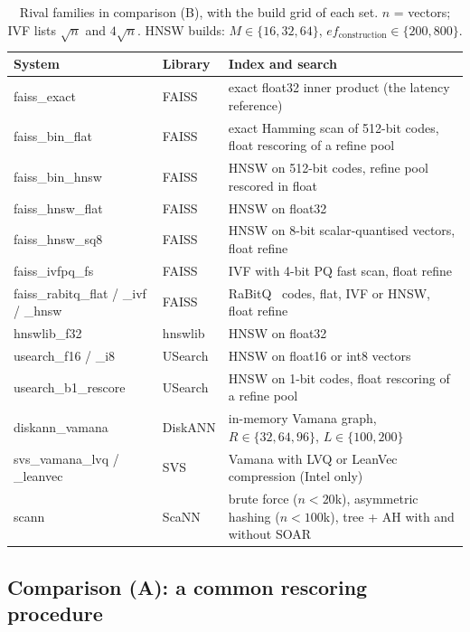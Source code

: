 \begin{table}[t]\centering\small
\caption{Rival families in comparison (B), with the build grid of each set. $n$ = vectors; IVF lists
$\sqrt n$ and $4\sqrt n$. HNSW builds: $M \in \{16, 32, 64\}$, $ef_{\text{construction}} \in \{200, 800\}$.}\label{tab:systems}
\begin{tabularx}{\textwidth}{llX}\toprule
System & Library & Index and search\\\midrule
faiss\_exact & FAISS & exact float32 inner product (the latency reference)\\
faiss\_bin\_flat & FAISS & exact Hamming scan of 512-bit codes, float rescoring of a refine pool\\
faiss\_bin\_hnsw & FAISS & HNSW on 512-bit codes, refine pool rescored in float\\
faiss\_hnsw\_flat & FAISS & HNSW on float32\\
faiss\_hnsw\_sq8 & FAISS & HNSW on 8-bit scalar-quantised vectors, float refine\\
faiss\_ivfpq\_fs & FAISS & IVF with 4-bit PQ fast scan, float refine\\
faiss\_rabitq\_flat / \_ivf / \_hnsw & FAISS & RaBitQ~\cite{gao2024rabitq} codes, flat, IVF or HNSW, float refine\\
hnswlib\_f32 & hnswlib & HNSW on float32\\
usearch\_f16 / \_i8 & USearch & HNSW on float16 or int8 vectors\\
usearch\_b1\_rescore & USearch & HNSW on 1-bit codes, float rescoring of a refine pool\\
diskann\_vamana & DiskANN & in-memory Vamana graph, $R \in \{32, 64, 96\}$, $L \in \{100, 200\}$\\
svs\_vamana\_lvq / \_leanvec & SVS & Vamana with LVQ or LeanVec compression (Intel only)\\
scann & ScaNN & brute force ($n < 20$k), asymmetric hashing ($n < 100$k), tree + AH with and without SOAR\\\bottomrule
\end{tabularx}
\end{table}

\subsection{Comparison (A): a common rescoring procedure}\label{sec:compA}

